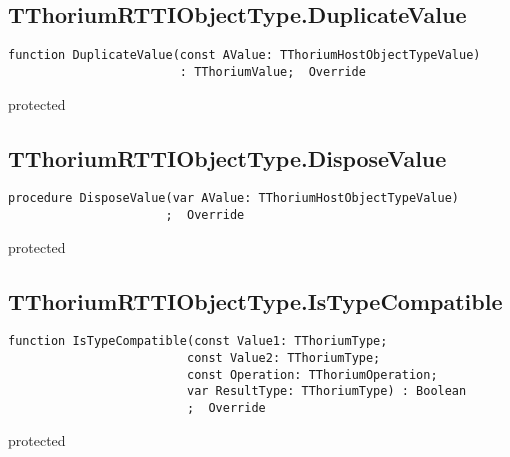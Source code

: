 \subsection{TThoriumRTTIObjectType.DuplicateValue}
\label{thoriumcore:thorium:tthoriumrttiobjecttype:duplicatevalue}
\begin{FPCList}
\Synopsis
\Declaration 

\begin{verbatim}
function DuplicateValue(const AValue: TThoriumHostObjectTypeValue)
                        : TThoriumValue;  Override
\end{verbatim}
\Visibility
protected
\Description
\Errors
\end{FPCList}
\subsection{TThoriumRTTIObjectType.DisposeValue}
\label{thoriumcore:thorium:tthoriumrttiobjecttype:disposevalue}
\begin{FPCList}
\Synopsis
\Declaration 

\begin{verbatim}
procedure DisposeValue(var AValue: TThoriumHostObjectTypeValue)
                      ;  Override
\end{verbatim}
\Visibility
protected
\Description
\Errors
\end{FPCList}
\subsection{TThoriumRTTIObjectType.IsTypeCompatible}
\label{thoriumcore:thorium:tthoriumrttiobjecttype:istypecompatible}
\begin{FPCList}
\Synopsis
\Declaration 

\begin{verbatim}
function IsTypeCompatible(const Value1: TThoriumType;
                         const Value2: TThoriumType;
                         const Operation: TThoriumOperation;
                         var ResultType: TThoriumType) : Boolean
                         ;  Override
\end{verbatim}
\Visibility
protected
\Description
\Errors
\end{FPCList}
